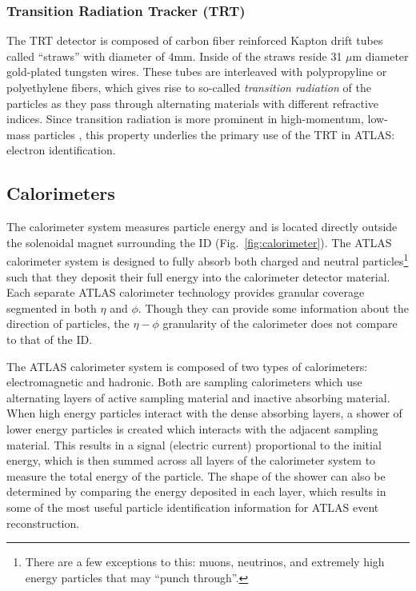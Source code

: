 \subsubsection{Transition Radiation Tracker (TRT)} 
The TRT detector is composed of carbon fiber reinforced Kapton drift tubes called ``straws'' with diameter of 4mm.
Inside of the straws reside 31 $\mu$m diameter gold-plated tungsten wires.
These tubes are interleaved with polypropyline or polyethylene fibers, which gives rise to so-called \textit{transition radiation} of the particles as they pass through alternating materials with different refractive indices.
Since transition radiation is more prominent in high-momentum, low-mass particles \cite{Andronic_2012}, this property underlies the primary use of the TRT in ATLAS: electron identification.

\subsection{Calorimeters}
\label{sec:calorimeters}

The calorimeter system measures particle energy and is located directly outside the solenoidal magnet surrounding the ID (Fig.~\ref{fig:calorimeter}).
The ATLAS calorimeter system is designed to fully absorb both charged and neutral particles\footnote{There are a few exceptions to this: muons, neutrinos, and extremely high energy particles that may ``punch through''.} such that they deposit their full energy into the calorimeter detector material.
Each separate ATLAS calorimeter technology provides granular coverage segmented in both $\eta$ and $\phi$.
Though they can provide some information about the direction of particles, the $\eta-\phi$ granularity of the calorimeter does not compare to that of the ID.

The ATLAS calorimeter system is composed of two types of calorimeters: electromagnetic and hadronic.
Both are sampling calorimeters which use alternating layers of active sampling material and inactive absorbing material.
When high energy particles interact with the dense absorbing layers, a shower of lower energy particles is created which interacts with the adjacent sampling material.
This results in a signal (electric current) proportional to the initial energy, which is then summed across all layers of the calorimeter system to measure the total energy of the particle.
The shape of the shower can also be determined by comparing the energy deposited in each layer, which results in some of the most useful particle identification information for ATLAS event reconstruction.

